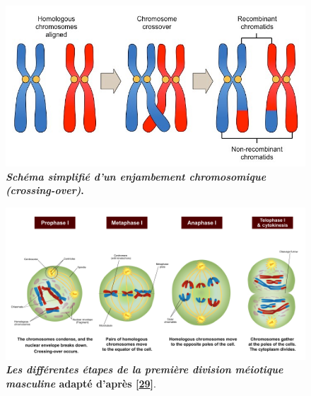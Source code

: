 \documentclass[12pt,a4paper,twoside]{ugathesis}
\theoremstyle{definition}
\theoremstyle{definition}
\theoremstyle{definition}
\theoremstyle{remark}
\begin{document}
\begin{figure}

{\centering \includegraphics[scale=0.35]{figure/crossingover} 

}

\caption[Schéma simplifié d'un enjambement chromosomique (crossing-over)]{\textbf{\emph{Schéma simplifié d'un enjambement
chromosomique (crossing-over)}.}}\label{fig:pictcrossingover}
\end{figure}




\newpage 

\begin{figure}

{\centering \includegraphics[scale=0.43]{figure/MeiosisI} 

}

\caption[Les différentes étapes de la première division méiotique masculine]{\textbf{\emph{Les différentes étapes de la première
division méiotique masculine} adapté d'après
{[}\protect\hyperlink{ref-Reece2014}{29}{]}}.}\label{fig:meiosei}
\end{figure}
\end{document}
